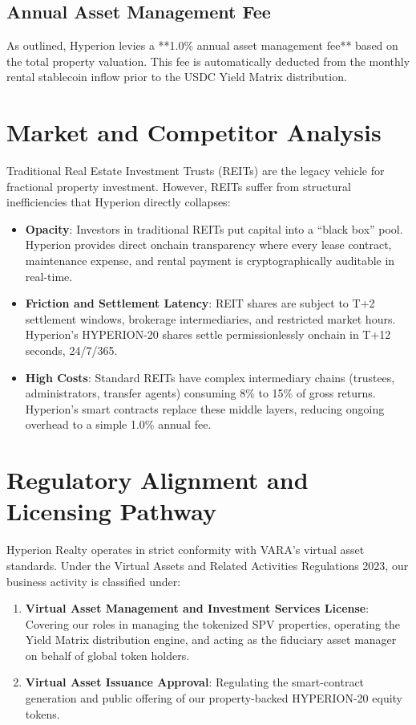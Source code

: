 \documentclass[11pt]{article}
\begin{document}
\subsection{Annual Asset Management Fee}
As outlined, Hyperion levies a **1.0\% annual asset management fee** based on the total property valuation. This fee is automatically deducted from the monthly rental stablecoin inflow prior to the USDC Yield Matrix distribution.

\section{Market and Competitor Analysis}
Traditional Real Estate Investment Trusts (REITs) are the legacy vehicle for fractional property investment. However, REITs suffer from structural inefficiencies that Hyperion directly collapses:
\begin{itemize}
    \item \textbf{Opacity}: Investors in traditional REITs put capital into a ``black box'' pool. Hyperion provides direct onchain transparency where every lease contract, maintenance expense, and rental payment is cryptographically auditable in real-time.
    \item \textbf{Friction and Settlement Latency}: REIT shares are subject to T+2 settlement windows, brokerage intermediaries, and restricted market hours. Hyperion's HYPERION-20 shares settle permissionlessly onchain in T+12 seconds, 24/7/365.
    \item \textbf{High Costs}: Standard REITs have complex intermediary chains (trustees, administrators, transfer agents) consuming 8\% to 15\% of gross returns. Hyperion's smart contracts replace these middle layers, reducing ongoing overhead to a simple 1.0\% annual fee.
\end{itemize}

\section{Regulatory Alignment and Licensing Pathway}
Hyperion Realty operates in strict conformity with VARA's virtual asset standards. Under the Virtual Assets and Related Activities Regulations 2023, our business activity is classified under:
\begin{enumerate}
    \item \textbf{Virtual Asset Management and Investment Services License}: Covering our roles in managing the tokenized SPV properties, operating the Yield Matrix distribution engine, and acting as the fiduciary asset manager on behalf of global token holders.
    \item \textbf{Virtual Asset Issuance Approval}: Regulating the smart-contract generation and public offering of our property-backed HYPERION-20 equity tokens.
\end{enumerate}
\end{document}
